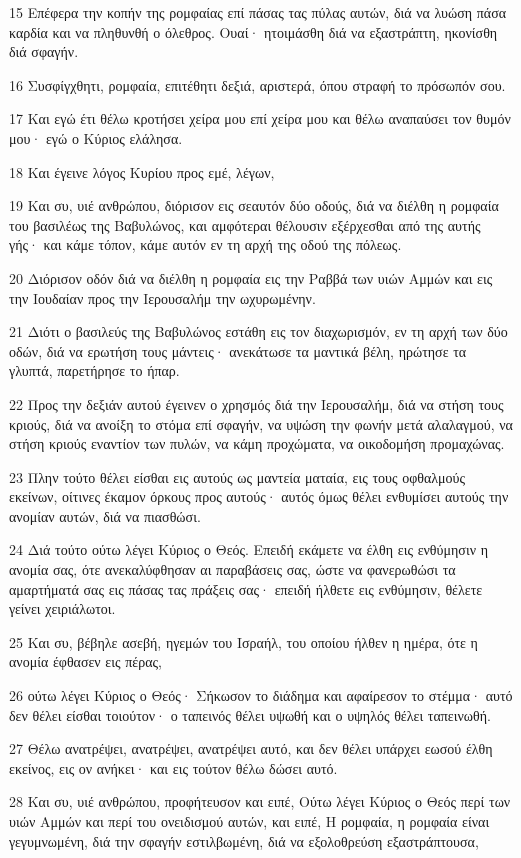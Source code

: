 \par 15 Επέφερα την κοπήν της ρομφαίας επί πάσας τας πύλας αυτών, διά να λυώση πάσα καρδία και να πληθυνθή ο όλεθρος. Ουαί· ητοιμάσθη διά να εξαστράπτη, ηκονίσθη διά σφαγήν.
\par 16 Συσφίγχθητι, ρομφαία, επιτέθητι δεξιά, αριστερά, όπου στραφή το πρόσωπόν σου.
\par 17 Και εγώ έτι θέλω κροτήσει χείρα μου επί χείρα μου και θέλω αναπαύσει τον θυμόν μου· εγώ ο Κύριος ελάλησα.
\par 18 Και έγεινε λόγος Κυρίου προς εμέ, λέγων,
\par 19 Και συ, υιέ ανθρώπου, διόρισον εις σεαυτόν δύο οδούς, διά να διέλθη η ρομφαία του βασιλέως της Βαβυλώνος, και αμφότεραι θέλουσιν εξέρχεσθαι από της αυτής γής· και κάμε τόπον, κάμε αυτόν εν τη αρχή της οδού της πόλεως.
\par 20 Διόρισον οδόν διά να διέλθη η ρομφαία εις την Ραββά των υιών Αμμών και εις την Ιουδαίαν προς την Ιερουσαλήμ την ωχυρωμένην.
\par 21 Διότι ο βασιλεύς της Βαβυλώνος εστάθη εις τον διαχωρισμόν, εν τη αρχή των δύο οδών, διά να ερωτήση τους μάντεις· ανεκάτωσε τα μαντικά βέλη, ηρώτησε τα γλυπτά, παρετήρησε το ήπαρ.
\par 22 Προς την δεξιάν αυτού έγεινεν ο χρησμός διά την Ιερουσαλήμ, διά να στήση τους κριούς, διά να ανοίξη το στόμα επί σφαγήν, να υψώση την φωνήν μετά αλαλαγμού, να στήση κριούς εναντίον των πυλών, να κάμη προχώματα, να οικοδομήση προμαχώνας.
\par 23 Πλην τούτο θέλει είσθαι εις αυτούς ως μαντεία ματαία, εις τους οφθαλμούς εκείνων, οίτινες έκαμον όρκους προς αυτούς· αυτός όμως θέλει ενθυμίσει αυτούς την ανομίαν αυτών, διά να πιασθώσι.
\par 24 Διά τούτο ούτω λέγει Κύριος ο Θεός. Επειδή εκάμετε να έλθη εις ενθύμησιν η ανομία σας, ότε ανεκαλύφθησαν αι παραβάσεις σας, ώστε να φανερωθώσι τα αμαρτήματά σας εις πάσας τας πράξεις σας· επειδή ήλθετε εις ενθύμησιν, θέλετε γείνει χειριάλωτοι.
\par 25 Και συ, βέβηλε ασεβή, ηγεμών του Ισραήλ, του οποίου ήλθεν η ημέρα, ότε η ανομία έφθασεν εις πέρας,
\par 26 ούτω λέγει Κύριος ο Θεός· Σήκωσον το διάδημα και αφαίρεσον το στέμμα· αυτό δεν θέλει είσθαι τοιούτον· ο ταπεινός θέλει υψωθή και ο υψηλός θέλει ταπεινωθή.
\par 27 Θέλω ανατρέψει, ανατρέψει, ανατρέψει αυτό, και δεν θέλει υπάρχει εωσού έλθη εκείνος, εις ον ανήκει· και εις τούτον θέλω δώσει αυτό.
\par 28 Και συ, υιέ ανθρώπου, προφήτευσον και ειπέ, Ούτω λέγει Κύριος ο Θεός περί των υιών Αμμών και περί του ονειδισμού αυτών, και ειπέ, Η ρομφαία, η ρομφαία είναι γεγυμνωμένη, διά την σφαγήν εστιλβωμένη, διά να εξολοθρεύση εξαστράπτουσα,
